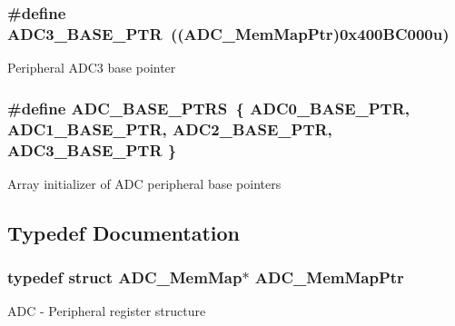 \subsubsection[{A\+D\+C3\+\_\+\+B\+A\+S\+E\+\_\+\+P\+T\+R}]{\setlength{\rightskip}{0pt plus 5cm}\#define A\+D\+C3\+\_\+\+B\+A\+S\+E\+\_\+\+P\+T\+R~(({\bf A\+D\+C\+\_\+\+Mem\+Map\+Ptr})0x400\+B\+C000u)}\label{group___a_d_c___peripheral_gadbd63bcf12f71b0dd3ac6553315dfb0e}
Peripheral A\+D\+C3 base pointer \hypertarget{group___a_d_c___peripheral_gaaa8175a3a2f4efaceeed5bd26c0b2d3f}{}
\subsubsection[{A\+D\+C\+\_\+\+B\+A\+S\+E\+\_\+\+P\+T\+R\+S}]{\setlength{\rightskip}{0pt plus 5cm}\#define A\+D\+C\+\_\+\+B\+A\+S\+E\+\_\+\+P\+T\+R\+S~\{ {\bf A\+D\+C0\+\_\+\+B\+A\+S\+E\+\_\+\+P\+T\+R}, {\bf A\+D\+C1\+\_\+\+B\+A\+S\+E\+\_\+\+P\+T\+R}, {\bf A\+D\+C2\+\_\+\+B\+A\+S\+E\+\_\+\+P\+T\+R}, {\bf A\+D\+C3\+\_\+\+B\+A\+S\+E\+\_\+\+P\+T\+R} \}}\label{group___a_d_c___peripheral_gaaa8175a3a2f4efaceeed5bd26c0b2d3f}
Array initializer of A\+D\+C peripheral base pointers 

\subsection{Typedef Documentation}
\hypertarget{group___a_d_c___peripheral_ga1673c677bf7c0ca339c8563e06de75fa}{}
\subsubsection[{A\+D\+C\+\_\+\+Mem\+Map\+Ptr}]{\setlength{\rightskip}{0pt plus 5cm}typedef struct {\bf A\+D\+C\+\_\+\+Mem\+Map}$\ast$ {\bf A\+D\+C\+\_\+\+Mem\+Map\+Ptr}}\label{group___a_d_c___peripheral_ga1673c677bf7c0ca339c8563e06de75fa}
A\+D\+C -\/ Peripheral register structure 